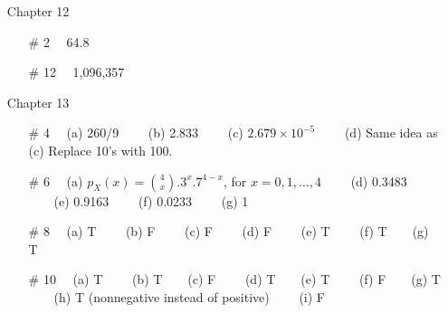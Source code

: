 \documentclass[12pt]{article}
\begin{document}
\begin{itemize}
%
%


\item[] Chapter 12           \label{ANS_12}
	\begin{itemize}
	\item[\# 2]   \ \  64.8
	\item[\# 12]   \ \ 1,096,357
	\end{itemize}


\item[] Chapter 13          \label{ANS_13}
	\begin{itemize}
	\item[\# 4] \ \  (a) 260/9  \ \ \ \ (b) 2.833 \ \ \ \   (c)  $2.679\times 10^{-5}$ \ \ \ \ (d) Same idea as (c) Replace 10's with 100.  \ \ \ \ 
	\item[\# 6] \ \   (a)  $p_X(x)=\binom{4}{x}.3^x .7^{4-x}$, for $x=0,1,\ldots,4$ \ \ \ \ (d) 0.3483 \ \ \ \   (e) 0.9163  \ \ \ \   (f) 0.0233  \ \ \ \   (g) 1

	\item[\# 8] \ \   (a) T  \ \ \ \ (b) F \ \ \ \   (c) F  \ \ \ \ (d) F \ \ \ \  (e)  T \ \ \ \ (f)  T\ \ \ \   (g)  T
	\item[\# 10] \ \ (a)  T \ \ \ \ (b)  T\ \ \ \   (c)  F \ \ \ \ (d)  T\ \ \ \  (e)  T \ \ \ \ (f) F\ \ \ \   (g)  T \ \ \ \ (h) T  (nonnegative instead of positive) \ \ \ \  (i) F 
	\end{itemize}




\end{itemize}
\end{document}
